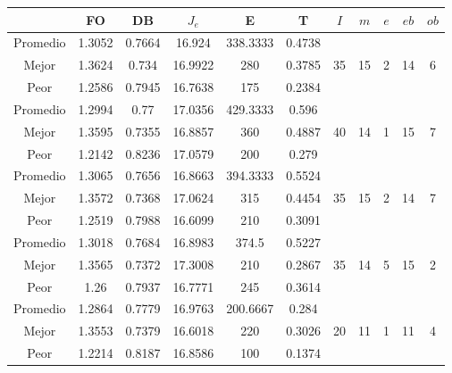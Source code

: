 \begin{table}[h!]
    \footnotesize
    \begin{center}
        \begin{tabular}{|c|c|c|c|c|c|c|c|c|c|c|}
        \hline
            & {\bf FO} & {\bf DB} & $J_e$ & {\bf E} & {\bf T} & $I$ & $m$ & $e$ & $eb$ & $ob$ \\
        \hline
        \hline
            Promedio  & 1.3052 & 0.7664 & 16.924 & 338.3333 & 0.4738 &  &  &  &  & \\
            \cline{1-6}
            Mejor & 1.3624 & 0.734  & 16.9922 & 280 & 0.3785 & 35 & 15 & 2 & 14 & 6\\
            \cline{1-6}
            Peor & 1.2586 & 0.7945  & 16.7638 & 175 & 0.2384 &  &  &  &  & \\
        \hline
        \hline
            Promedio  & 1.2994 & 0.77 & 17.0356 & 429.3333 & 0.596 &  &  &  &  & \\
            \cline{1-6}
            Mejor & 1.3595 & 0.7355  & 16.8857 & 360 & 0.4887 & 40 & 14 & 1 & 15 & 7\\
            \cline{1-6}
            Peor & 1.2142 & 0.8236  & 17.0579 & 200 & 0.279 &  &  &  &  & \\
        \hline
        \hline
            Promedio  & 1.3065 & 0.7656 & 16.8663 & 394.3333 & 0.5524 &  &  &  &  & \\
            \cline{1-6}
            Mejor & 1.3572 & 0.7368  & 17.0624 & 315 & 0.4454 & 35 & 15 & 2 & 14 & 7\\
            \cline{1-6}
            Peor & 1.2519 & 0.7988  & 16.6099 & 210 & 0.3091 &  &  &  &  & \\
        \hline
        \hline
            Promedio  & 1.3018 & 0.7684 & 16.8983 & 374.5 & 0.5227 &  &  &  &  & \\
            \cline{1-6}
            Mejor & 1.3565 & 0.7372  & 17.3008 & 210 & 0.2867 & 35 & 14 & 5 & 15 & 2\\
            \cline{1-6}
            Peor & 1.26 & 0.7937  & 16.7771 & 245 & 0.3614 &  &  &  &  & \\
        \hline
        \hline
            Promedio  & 1.2864 & 0.7779 & 16.9763 & 200.6667 & 0.284 &  &  &  &  & \\
            \cline{1-6}
            Mejor & 1.3553 & 0.7379  & 16.6018 & 220 & 0.3026 & 20 & 11 & 1 & 11 & 4\\
            \cline{1-6}
            Peor & 1.2214 & 0.8187  & 16.8586 & 100 & 0.1374 &  &  &  &  & \\

\end{tabular}
\end{center}
\end{table}
